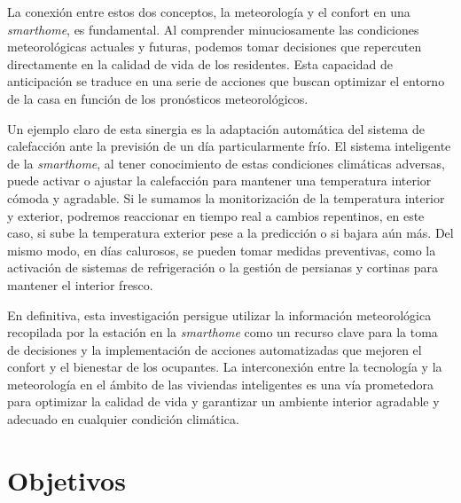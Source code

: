 La conexión entre estos dos conceptos, la meteorología y el confort en una \textit{smarthome}, es fundamental. Al comprender minuciosamente las condiciones meteorológicas actuales y futuras, podemos tomar decisiones que repercuten directamente en la calidad de vida de los residentes. Esta capacidad de anticipación se traduce en una serie de acciones que buscan optimizar el entorno de la casa en función de los pronósticos meteorológicos.


Un ejemplo claro de esta sinergia es la adaptación automática del sistema de calefacción ante la previsión de un día particularmente frío. El sistema inteligente de la \textit{smarthome}, al tener conocimiento de estas condiciones climáticas adversas, puede activar o ajustar la calefacción para mantener una temperatura interior cómoda y agradable. Si le sumamos la monitorización de la temperatura interior y exterior, podremos reaccionar en tiempo real a cambios repentinos, en este caso, si sube la temperatura exterior pese a la predicción o si bajara aún más. Del mismo modo, en días calurosos, se pueden tomar medidas preventivas, como la activación de sistemas de refrigeración o la gestión de persianas y cortinas para mantener el interior fresco.

En definitiva, esta investigación persigue utilizar la información meteorológica recopilada por la estación en la \textit{smarthome} como un recurso clave para la toma de decisiones y la implementación de acciones automatizadas que mejoren el confort y el bienestar de los ocupantes. La interconexión entre la tecnología y la meteorología en el ámbito de las viviendas inteligentes es una vía prometedora para optimizar la calidad de vida y garantizar un ambiente interior agradable y adecuado en cualquier condición climática.

\section{Objetivos}


